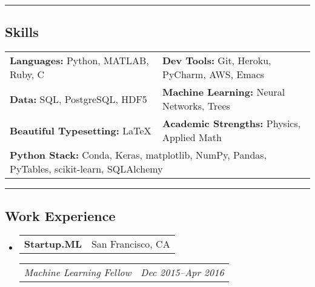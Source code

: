 \documentclass[10pt,letterpaper]{article}
\makeatletter
\newenvironment{indentsection}[1]%
{\begin{list}{}%
	{\setlength{\leftmargin}{#1}}%
	\item[]%
}
{\end{list}}
\newcommand{\headerrow}[2]
{\begin{tabular*}{\linewidth}{l@{\extracolsep{\fill}}r}
	#1 &
	#2 \\
\end{tabular*}}
\makeatother
\begin{document}
\hrule
\subsection*{Skills}
\begin{indentsection}{\parindent}
\begin{tabular}{p{0.5\linewidth}   p{0.5\linewidth} } 
	\textbf{Languages:}  Python, MATLAB, Ruby, C
	& \textbf{Dev Tools:}  Git, Heroku, PyCharm, AWS, Emacs \\  

	\textbf{Data:} SQL, PostgreSQL, HDF5
	& \textbf{Machine Learning:} Neural Networks, Trees  \\
	
	\textbf{Beautiful Typesetting:} \LaTeX
	& \textbf{Academic Strengths:} Physics, Applied Math \\
	
	\multicolumn{2}{l}{\textbf{Python Stack:} Conda, Keras, matplotlib, NumPy, Pandas, PyTables, scikit-learn, SQLAlchemy} \\
\end{tabular}
\end{indentsection}

\hrule
\subsection*{Work Experience}
\begin{itemize}
	\parskip=-0.1em
	\item
	\headerrow
		{\textbf{Startup.ML}}
		{San Francisco, CA}
	\headerrow
		{\emph{Machine Learning Fellow}}
		{\emph{Dec 2015--Apr 2016}}
\end{itemize}
\end{document}

